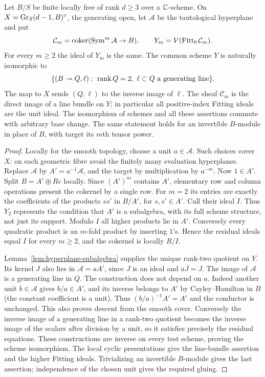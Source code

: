\begin{theorem}\label{thm:universal-hyperplane}
Let $B/S$ be finite locally free of rank $d\ge3$ over a
$\mathbb C$-scheme. On $X=\operatorname{Gr}_S(d-1,B)^\circ$, the generating open,
let $\mathcal A$ be the tautological hyperplane and put
\[
 \mathcal C_m=\operatorname{coker}(\operatorname{Sym}^m\mathcal A\to B),
 \qquad Y_m=V(\operatorname{Fitt}_0\mathcal C_m).
\]
For every $m\ge2$ the ideal of $Y_m$ is the same. The common scheme
$Y$ is naturally isomorphic to
\begin{equation}\label{eq:universal-hyperplane-incidence}
 \{(B\twoheadrightarrow Q,\ell):\ \operatorname{rank} Q=2,
                 \ \ell\subset Q\text{ a generating line}\}.
\end{equation}
The map to $X$ sends $(Q,\ell)$ to the inverse image of $\ell$.
The sheaf $\mathcal C_m$ is the direct image of a line bundle on
$Y$; in particular all positive-index Fitting ideals are the unit
ideal. The isomorphism of schemes and all these assertions commute
with arbitrary base change. The same statement holds for an
invertible $B$-module in place of $B$, with target its $m$th tensor
power.
\end{theorem}
\begin{proof}
Locally for the smooth topology, choose a unit $a\in\mathcal A$.
Such choices cover $X$: on each geometric fibre avoid the finitely
many evaluation hyperplanes. Replace $\mathcal A$ by
$A'=a^{-1}\mathcal A$, and the target by multiplication by $a^{-m}$.
Now $1\in A'$. Split $B=A'\oplus Re$ locally. Since $(A')^m$
contains $A'$, elementary row and column operations present the
cokernel by a single row. For $m=2$ its entries are exactly the
coefficients of the products $ss'$ in $B/A'$, for $s,s'\in A'$.
Call their ideal $I$. Thus $Y_2$ represents the condition that $A'$
is a subalgebra, with its full scheme structure, not just its support.
Modulo $I$ all higher products lie in $A'$. Conversely every
quadratic product is an $m$-fold product by inserting $1$'s.
Hence the residual ideals equal $I$ for every $m\ge2$, and the
cokernel is locally $R/I$.

Lemma~\ref{lem:hyperplane-subalgebra} supplies the unique rank-two
quotient on $Y$. Its kernel $J$ also lies in $\mathcal A=aA'$,
since $J$ is an ideal and $aJ=J$. The image of $\mathcal A$ is a
generating line in $Q$. The construction does not depend on $a$.
Indeed another unit $b\in\mathcal A$ gives $b/a\in A'$, and its
inverse belongs to $A'$ by Cayley--Hamilton in $B$ (the constant
coefficient is a unit). Thus $(b/a)^{-1}A'=A'$ and the conductor
is unchanged. This also proves descent from the smooth cover.
Conversely the inverse image of a generating line in a rank-two
quotient becomes the inverse image of the scalars after division
by a unit, so it satisfies precisely the residual equations.
These constructions are inverse on every test scheme, proving the
scheme isomorphism. The local cyclic presentations give the
line-bundle assertion and the higher Fitting ideals. Trivializing
an invertible $B$-module gives the last assertion; independence of
the chosen unit gives the required gluing.
\end{proof}

